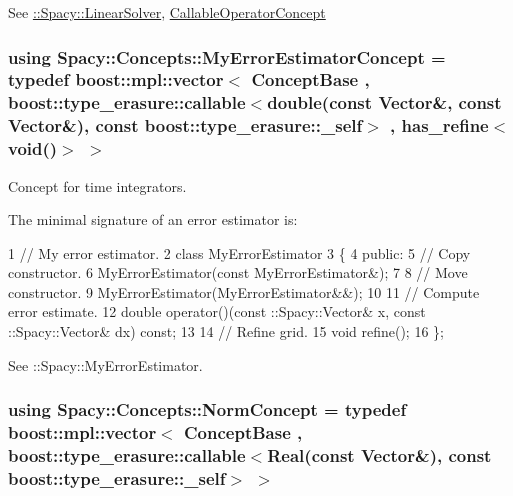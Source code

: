 See \hyperlink{namespaceSpacy_a7d5cd1c6fb9dd85aa345b536caf30bba_LinearSolverAnchor}{\+:\+:Spacy\+:\+:Linear\+Solver}, \hyperlink{group__ConceptGroup_gadec0c664abaacc2065dadd8b11cc8d30_CallableOperatorConceptAnchor}{Callable\+Operator\+Concept} \hypertarget{group__ConceptGroup_ga6b5c97b0e58318ef98c43a9b8a7dae08_ga6b5c97b0e58318ef98c43a9b8a7dae08}{}
\subsubsection[{My\+Error\+Estimator\+Concept}]{\setlength{\rightskip}{0pt plus 5cm}using {\bf Spacy\+::\+Concepts\+::\+My\+Error\+Estimator\+Concept} = typedef boost\+::mpl\+::vector$<$ {\bf Concept\+Base} , boost\+::type\+\_\+erasure\+::callable$<$double(const {\bf Vector}\&, const {\bf Vector}\&), const boost\+::type\+\_\+erasure\+::\+\_\+self$>$ , has\+\_\+refine$<$void()$>$ $>$}\label{group__ConceptGroup_ga6b5c97b0e58318ef98c43a9b8a7dae08_ga6b5c97b0e58318ef98c43a9b8a7dae08}


Concept for time integrators. 

\label{group__ConceptGroup_ga6b5c97b0e58318ef98c43a9b8a7dae08_ErrorEstimatorConceptAnchor}%
\hypertarget{group__ConceptGroup_ga6b5c97b0e58318ef98c43a9b8a7dae08_ErrorEstimatorConceptAnchor}{}%
The minimal signature of an error estimator is\+: 
\begin{DoxyCode}
1 // My error estimator.
2 class MyErrorEstimator
3 \{
4 public:
5   // Copy constructor.
6   MyErrorEstimator(const MyErrorEstimator&);
7 
8   // Move constructor.
9   MyErrorEstimator(MyErrorEstimator&&);
10 
11   // Compute error estimate.
12   double operator()(const ::Spacy::Vector& x, const ::Spacy::Vector& dx) const;
13 
14   // Refine grid.
15   void refine();
16 \};
\end{DoxyCode}


See \+:\+:Spacy\+:\+:My\+Error\+Estimator. \hypertarget{group__ConceptGroup_ga8b6032c46f6e31840a2c956c6360549b_ga8b6032c46f6e31840a2c956c6360549b}{}
\subsubsection[{Norm\+Concept}]{\setlength{\rightskip}{0pt plus 5cm}using {\bf Spacy\+::\+Concepts\+::\+Norm\+Concept} = typedef boost\+::mpl\+::vector$<$ {\bf Concept\+Base} , boost\+::type\+\_\+erasure\+::callable$<${\bf Real}(const {\bf Vector}\&), const boost\+::type\+\_\+erasure\+::\+\_\+self$>$ $>$}\label{group__ConceptGroup_ga8b6032c46f6e31840a2c956c6360549b_ga8b6032c46f6e31840a2c956c6360549b}


